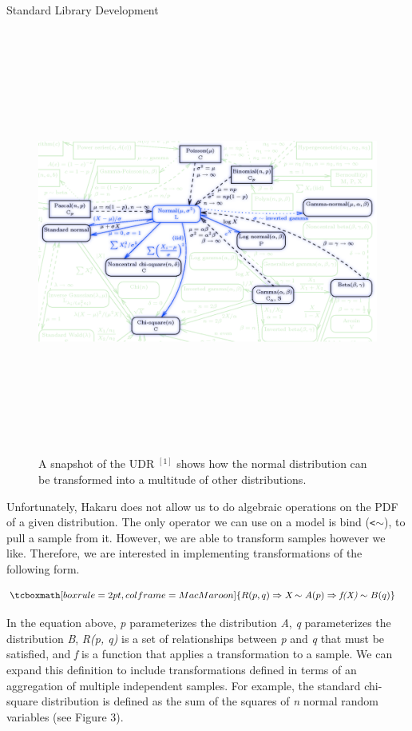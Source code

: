 \documentclass[22pt]{beamer}
\begin{document}
\begin{frame}[fragile]
\begin{textblock}{5}
\begin{textblock}{5}
\begin{block}{\Large{Standard Library Development}}
\begin{figure}
\centering
\includegraphics[height=14cm]{UDR.png}
\caption{\tiny{A snapshot of the UDR $^{[1]}$ shows how the normal distribution can be transformed into a multitude of other distributions.}}
\end{figure}

\scriptsize{Unfortunately, Hakaru does not allow us to do algebraic operations on the PDF of a given distribution. The only operator we can use on a model is bind ({\tt \tiny{<$\sim$}}), to pull a sample from it. However, we are able to transform samples however we like. Therefore, we are interested in implementing transformations of the following form.}

\begin{equation*}
\begin{aligned}
& \tcboxmath[boxrule=2pt,colframe=MacMaroon]{R(p, q) \Rightarrow \textit{X} \sim A(p) \Rightarrow \textit{f(X)} \sim B(q)}
\end{aligned}
\end{equation*}

\bigskip

\scriptsize{In the equation above, \textit{p} parameterizes the distribution \textit{A}}, \textit{q} parameterizes the distribution \textit{B}, \textit{R(p, q)} is a set of relationships between \textit{p} and \textit{q} that must be satisfied, and \textit{f} is a function that applies a transformation to a sample. We can expand this definition to include transformations defined in terms of an aggregation of multiple independent samples. For example, the standard chi-square distribution is defined as the sum of the squares of \textit{n} normal random variables (see Figure 3). 


\end{block}
\end{textblock}
\end{textblock}
\end{frame}
\end{document}
